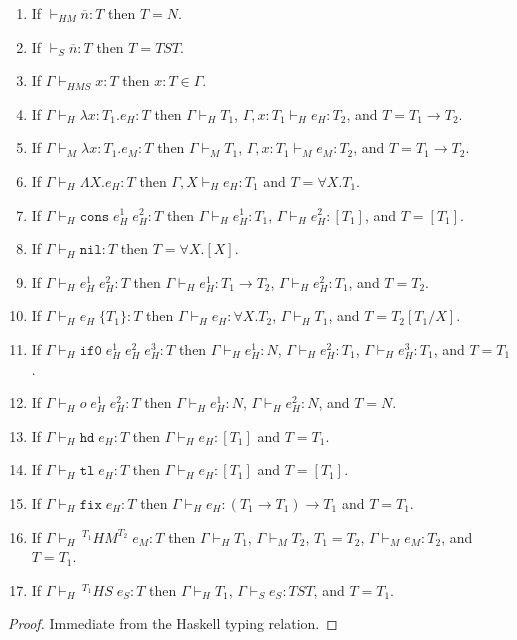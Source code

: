 \begin{hi}
\label{hi}
\begin{enumerate}
\item If $\vdash_{HM}\overline{n}:T$ then $T=N$.
\item If $\vdash_{S}\overline{n}:T$ then $T=TST$.
\item If $\Gamma\vdash_{HMS}x:T$ then $x:T\in\Gamma$.
\item If $\Gamma\vdash_{H}\lambda x:T_{1}.e_{H}:T$ then $\Gamma\vdash_{H}T_{1}$, $\Gamma,x:T_{1}\vdash_{H}e_{H}:T_{2}$, and $T=T_{1}\rightarrow T_{2}$.
\item If $\Gamma\vdash_{M}\lambda x:T_{1}.e_{M}:T$ then $\Gamma\vdash_{M}T_{1}$, $\Gamma,x:T_{1}\vdash_{M}e_{M}:T_{2}$, and $T=T_{1}\rightarrow T_{2}$.
\item If $\Gamma\vdash_{H}\Lambda X.e_{H}:T$ then $\Gamma,X\vdash_{H}e_{H}:T_{1}$ and $T=\forall X.T_{1}$.
\item If $\Gamma\vdash_{H}\mathtt{cons}\;e_{H}^{1}\;e_{H}^{2}:T$ then $\Gamma\vdash_{H}e_{H}^{1}:T_{1}$, $\Gamma\vdash_{H}e_{H}^{2}:[T_{1}]$, and $T=[T_{1}]$.
\item If $\Gamma\vdash_{H}\mathtt{nil}:T$ then $T=\forall X.[X]$.
\item If $\Gamma\vdash_{H}e_{H}^{1}\;e_{H}^{2}:T$ then $\Gamma\vdash_{H}e_{H}^{1}:T_{1}\rightarrow T_{2}$, $\Gamma\vdash_{H}e_{H}^{2}:T_{1}$, and $T=T_{2}$.
\item If $\Gamma\vdash_{H}e_{H}\;\lbrace T_{1}\rbrace:T$ then $\Gamma\vdash_{H}e_{H}:\forall X.T_{2}$, $\Gamma\vdash_{H}T_{1}$, and $T=T_{2}[T_{1}/X]$.
\item If $\Gamma\vdash_{H}\mathtt{if0}\;e_{H}^{1}\;e_{H}^{2}\;e_{H}^{3}:T$ then $\Gamma\vdash_{H}e_{H}^{1}:N$, $\Gamma\vdash_{H}e_{H}^{2}:T_{1}$, $\Gamma\vdash_{H}e_{H}^{3}:T_{1}$, and $T=T_{1}$.
\item If $\Gamma\vdash_{H}o\;e_{H}^{1}\;e_{H}^{2}:T$ then $\Gamma\vdash_{H}e_{H}^{1}:N$, $\Gamma\vdash_{H}e_{H}^{2}:N$, and $T=N$.
\item If $\Gamma\vdash_{H}\mathtt{hd}\;e_{H}:T$ then $\Gamma\vdash_{H}e_{H}:[T_{1}]$ and $T=T_{1}$.
\item If $\Gamma\vdash_{H}\mathtt{tl}\;e_{H}:T$ then $\Gamma\vdash_{H}e_{H}:[T_{1}]$ and $T=[T_{1}]$.
\item If $\Gamma\vdash_{H}\mathtt{fix}\;e_{H}:T$ then $\Gamma\vdash_{H}e_{H}:(T_{1}\rightarrow T_{1})\rightarrow T_{1}$ and $T=T_{1}$.
\item If $\Gamma\vdash_{H}\,^{T_{1}}HM^{T_{2}}\;e_{M}:T$ then $\Gamma\vdash_{H}T_{1}$, $\Gamma\vdash_{M}T_{2}$, $T_{1}=T_{2}$, $\Gamma\vdash_{M}e_{M}:T_{2}$, and $T=T_{1}$.
\item If $\Gamma\vdash_{H}\,^{T_{1}}HS\;e_{S}:T$ then $\Gamma\vdash_{H}T_{1}$, $\Gamma\vdash_{S}e_{S}:TST$, and $T=T_{1}$.


\end{enumerate}
\begin{proof}
Immediate from the Haskell typing relation.
\end{proof}
\end{hi}